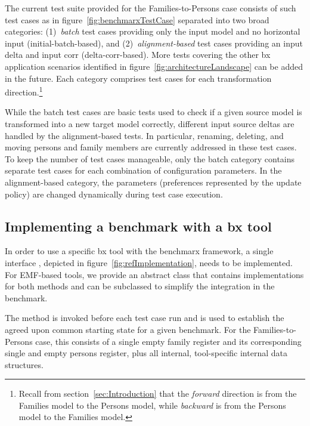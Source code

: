 The current test suite provided for the Families-to-Persons case consists of such test cases as in figure~\ref{fig:benchmarxTestCase} separated into two broad categories: (1)~\emph{batch} test cases providing only the input model and no horizontal input (initial-batch-based), and (2)~\emph{alignment-based} test cases providing an input delta and input corr (delta-corr-based).
More tests covering the other bx application scenarios identified in figure~\ref{fig:architectureLandscape} can be added in the future.
Each category comprises test cases for each transformation direction.\footnote{Recall from section~\ref{sec:Introduction} that the \emph{forward} direction is from the Families model to the Persons model, while \emph{backward} is from the Persons model to the Families model.}

While the batch test cases are basic tests used to check if a given source model is transformed into a new target model correctly, different input source deltas are handled by the alignment-based tests. 
In particular, renaming, deleting, and moving persons and family members are currently addressed in these test cases. 
To keep the number of test cases manageable, only the batch category contains separate test cases for each combination of configuration parameters.
In the alignment-based category, the parameters (preferences represented by the update policy) are changed dynamically during test case execution.



\subsection{Implementing a benchmark with a bx tool}

In order to use a specific bx tool with the benchmarx framework, a single interface , depicted in figure~\ref{fig:refImplementation}, needs to be implemented.
For EMF-based tools, we provide an abstract class  that contains implementations for both  methods and can be subclassed to simplify the integration in the benchmark.

The method  is invoked before each test case run and is used to establish the agreed upon common starting state for a given benchmark.
For the Families-to-Persons case, this consists of a single empty family register and its corresponding single and empty persons register, plus all internal, tool-specific internal data structures. 

